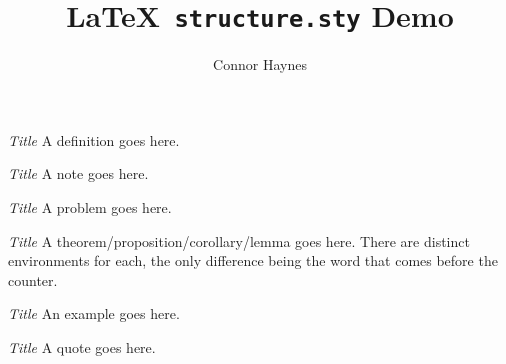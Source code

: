 \documentclass[10pt]{memoir}
\title{\LaTeX \texttt{ structure.sty} Demo}
\author{Connor Haynes}
\begin{document}
\maketitle
\begin{boxDef}{\emph{Title}}
  A definition goes here.
\end{boxDef}
\begin{boxNote}{\emph{Title}}
  A note goes here.
\end{boxNote}
\begin{boxProb}{\emph{Title}}
  A problem goes here.
\end{boxProb}
\begin{boxThm}{\emph{Title}}
  A theorem/proposition/corollary/lemma goes here. There are distinct environments for each, the only difference being the word that comes before the counter.
\end{boxThm}
\begin{boxEx}{\emph{Title}}
  An example goes here.
\end{boxEx}
\begin{boxQuote}{\emph{Title}}
  A quote goes here.
\end{boxQuote}
\end{document}

